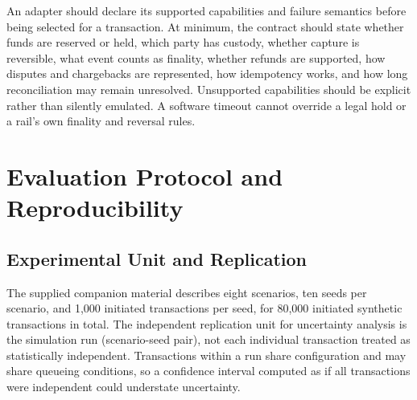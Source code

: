 \documentclass[12pt,a4paper,oneside]{report}
\begin{document}
An adapter should declare its supported capabilities and failure semantics before being selected for a transaction. At minimum, the contract should state whether funds are reserved or held, which party has custody, whether capture is reversible, what event counts as finality, whether refunds are supported, how disputes and chargebacks are represented, how idempotency works, and how long reconciliation may remain unresolved. Unsupported capabilities should be explicit rather than silently emulated. A software timeout cannot override a legal hold or a rail's own finality and reversal rules.

\chapter{Evaluation Protocol and Reproducibility}
\section{Experimental Unit and Replication}
The supplied companion material describes eight scenarios, ten seeds per scenario, and 1,000 initiated transactions per seed, for 80,000 initiated synthetic transactions in total. The independent replication unit for uncertainty analysis is the simulation run (scenario-seed pair), not each individual transaction treated as statistically independent. Transactions within a run share configuration and may share queueing conditions, so a confidence interval computed as if all transactions were independent could understate uncertainty.
\end{document}
